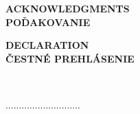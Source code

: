 \newpage
\thispagestyle{plain}
\vspace*{15cm} 
\begin{large}
\noindent
{}
	{\textbf{ACKNOWLEDGMENTS}\\}
	{\textbf{POĎAKOVANIE}\\}
\end{large}
\noindent


\newpage
\thispagestyle{plain}
\vspace*{15cm} 
\begin{large}
\noindent
{}
	{\textbf{DECLARATION}\\}
	{\textbf{ČESTNÉ PREHLÁSENIE}\\}
\end{large}
\noindent

\vspace*{0.5cm}\\
\begin{flushright}
............................\\
\Author
\end{flushright}
